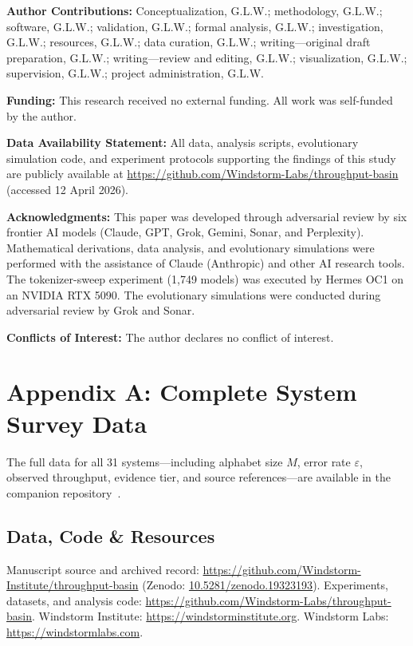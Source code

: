 \documentclass[11pt]{article}
\begin{document}
\vspace{1em}
\noindent\textbf{Author Contributions:} Conceptualization, G.L.W.; methodology, G.L.W.; software, G.L.W.; validation, G.L.W.; formal analysis, G.L.W.; investigation, G.L.W.; resources, G.L.W.; data curation, G.L.W.; writing---original draft preparation, G.L.W.; writing---review and editing, G.L.W.; visualization, G.L.W.; supervision, G.L.W.; project administration, G.L.W.

\noindent\textbf{Funding:} This research received no external funding. All work was self-funded by the author.

\noindent\textbf{Data Availability Statement:} All data, analysis scripts, evolutionary simulation code, and experiment protocols supporting the findings of this study are publicly available at \url{https://github.com/Windstorm-Labs/throughput-basin} (accessed 12 April 2026).

\noindent\textbf{Acknowledgments:} This paper was developed through adversarial review by six frontier AI models (Claude, GPT, Grok, Gemini, Sonar, and Perplexity). Mathematical derivations, data analysis, and evolutionary simulations were performed with the assistance of Claude (Anthropic) and other AI research tools. The tokenizer-sweep experiment (1,749 models) was executed by Hermes OC1 on an NVIDIA RTX 5090. The evolutionary simulations were conducted during adversarial review by Grok and Sonar.

\noindent\textbf{Conflicts of Interest:} The author declares no conflict of interest.

\section*{Appendix A: Complete System Survey Data}

The full data for all 31 systems---including alphabet size $M$, error rate $\varepsilon$, observed throughput, evidence tier, and source references---are available in the companion repository~\cite{whitmer2026tb_code}.

\subsection*{Data, Code \& Resources}
\noindent Manuscript source and archived record: \url{https://github.com/Windstorm-Institute/throughput-basin} (Zenodo: \href{https://doi.org/10.5281/zenodo.19323193}{10.5281/zenodo.19323193}). Experiments, datasets, and analysis code: \url{https://github.com/Windstorm-Labs/throughput-basin}. Windstorm Institute: \url{https://windstorminstitute.org}. Windstorm Labs: \url{https://windstormlabs.com}.
\end{document}
